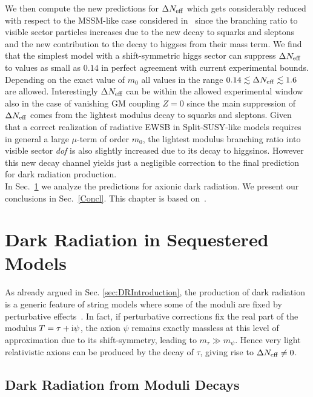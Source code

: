 \documentclass[12pt,a4paper]{book}
\begin{document}
We then compute the new predictions for $\Delta N_{\rm eff}$ which gets considerably reduced with respect to the MSSM-like case considered in~\cite{Cicoli:2012aq, Higaki:2012ar} since the branching ratio to visible sector particles increases due to the new decay to squarks and sleptons and the new contribution to the decay to higgses from their mass term. We find that the simplest model with a shift-symmetric higgs sector can suppress $\Delta N_{\rm eff}$ to values as small as $0.14$ in perfect agreement with current experimental bounds. Depending on the exact value of $m_0$ all values in the range $0.14 \lesssim \Delta N_{\rm eff} \lesssim 1.6$ are allowed. Interestingly $\Delta N_{\rm eff}$ can be within the allowed experimental window also in the case of vanishing GM coupling $Z = 0$ since the main suppression of $\Delta N_{\rm eff}$ comes from the lightest modulus decay to squarks and sleptons. Given that a correct realization of radiative EWSB in Split-SUSY-like models requires in general a large $\mu$-term of order $m_0$, the lightest modulus branching ratio into visible sector \textit{dof} is also slightly increased due to its decay to higgsinos. However this new decay channel yields just a negligible correction to the final prediction for dark radiation production.\\

In Sec.~\ref{drs} we analyze the predictions for axionic dark radiation. We present our conclusions in Sec.~\ref{Concl}. This chapter is based on~\cite{Cicoli:2015bpq}.

\section{Dark Radiation in Sequestered Models}
\label{drs}

As already argued in Sec. \ref{sec:DRIntroduction}, the production of dark radiation is a generic feature of string models where some of the moduli are fixed by perturbative effects~\cite{Allahverdi:2014ppa}. In fact, if perturbative corrections fix the real part of the modulus $T=\tau + {\rm i}\psi$, the axion $\psi$ remains exactly massless at this level of approximation due to its shift-symmetry, leading to $m_\tau \gg m_\psi$. Hence very light relativistic axions can be produced by the decay of $\tau$, giving rise to $\Delta N_{\rm eff} \neq 0$. 

\subsection{Dark Radiation from Moduli Decays}
\end{document}
